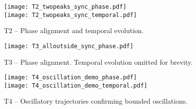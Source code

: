 \documentclass[11pt]{article}
\begin{document}
\begin{figure}[htbp!]
  \centering
  \texttt{[image: T2\_twopeaks\_sync\_phase.pdf]}\\[4pt]
  \texttt{[image: T2\_twopeaks\_sync\_temporal.pdf]}
  \caption{T2 -- Phase alignment and temporal evolution.}
\end{figure}

\begin{figure}[htbp!]
  \centering
  \texttt{[image: T3\_alloutside\_sync\_phase.pdf]}
  \caption{T3 -- Phase alignment. Temporal evolution omitted for brevity.}
\end{figure}

\begin{figure}[htbp!]
  \centering
  \texttt{[image: T4\_oscillation\_demo\_phase.pdf]}\\[4pt]
  \texttt{[image: T4\_oscillation\_demo\_temporal.pdf]}
  \caption{T4 -- Oscillatory trajectories confirming bounded oscillations.}
\end{figure}
\end{document}
